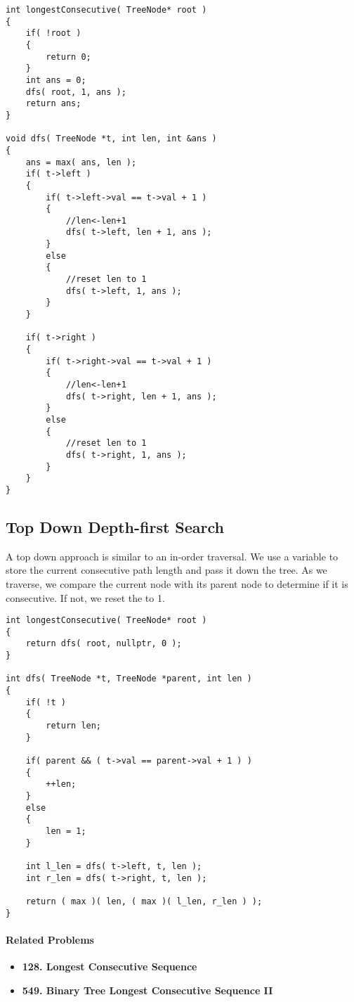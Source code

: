 \setcounter{lstlisting}{0}
\begin{lstlisting}[style=customc, caption={DFS}]
int longestConsecutive( TreeNode* root )
{
    if( !root )
    {
        return 0;
    }
    int ans = 0;
    dfs( root, 1, ans );
    return ans;
}

void dfs( TreeNode *t, int len, int &ans )
{
    ans = max( ans, len );
    if( t->left )
    {
        if( t->left->val == t->val + 1 )
        {
			//len<-len+1
            dfs( t->left, len + 1, ans );
        }
        else
        {
			//reset len to 1
            dfs( t->left, 1, ans );
        }
    }

    if( t->right )
    {
        if( t->right->val == t->val + 1 )
        {
            //len<-len+1
            dfs( t->right, len + 1, ans );
        }
        else
        {
            //reset len to 1
            dfs( t->right, 1, ans );
        }
    }
}

\end{lstlisting}
\subsection{Top Down Depth-first Search}
A top down approach is similar to an in-order traversal. We use a variable  to store the current consecutive path length and pass it down the tree. As we traverse, we compare the current node with its parent node to determine if it is consecutive. If not, we reset the  to 1.
\begin{lstlisting}[style=customc, caption={DFS 2}]
int longestConsecutive( TreeNode* root )
{
    return dfs( root, nullptr, 0 );
}

int dfs( TreeNode *t, TreeNode *parent, int len )
{
    if( !t )
    {
        return len;
    }

    if( parent && ( t->val == parent->val + 1 ) )
    {
        ++len;
    }
    else
    {
        len = 1;
    }

    int l_len = dfs( t->left, t, len );
    int r_len = dfs( t->right, t, len );

    return ( max )( len, ( max )( l_len, r_len ) );
}
\end{lstlisting}

\paragraph{Related Problems}
\begin{itemize}
\item \textbf{128. Longest Consecutive Sequence}
\item \textbf{549. Binary Tree Longest Consecutive Sequence II}
\end{itemize}